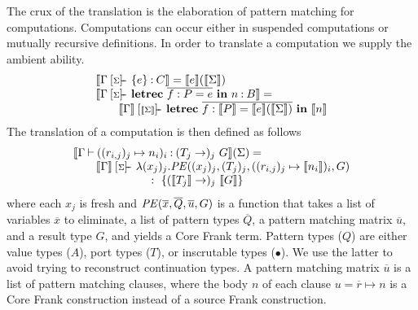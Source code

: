 \documentclass[11pt]{article}
\makeatletter
\newcommand{\many}{\overline}
\newcommand{\sem}[1]{\llbracket{#1}\rrbracket}
\newcommand\ba{\begin{array}}
\newcommand\ea{\end{array}}
\newcommand{\bl}{\ba[t]{@{}l@{}}}
\newcommand{\el}{\ea}
\newenvironment{syntax}{\[\ba{@{}l@{~}r@{~}c@{~}l@{}}}{\ea\]\ignorespacesafterend}
\newcommand{\sigentails}[1]{\mathbin{[{\text{\scriptsize ${#1}$}}]\!\text{-\!-}}\,}
\newcommand{\checkbase}[4]{#2 \mathbin{#1} #4 \mathbin{:} #3}
\newcommand{\has}[4]{\checkbase{\sigentails{#2}}{#1}{#3}{#4}}
\newcommand{\does}[3]{\checkbase{\vdash}{#1}{#2}{#3}}
\newcommand{\hasgs}{\has{\Gamma}{\sigs}}
\newcommand{\doesg}{\does{\Gamma}}
\newcommand{\checksgs}{\hasgs}
\newcommand{\checksdefg}{\doesg}
\newcommand{\sigs}{\Sigma}
\newcommand{\key}[1]{\textbf{#1}} %
\newcommand{\thunk}[1]{\{{#1}\}}
\newcommand\slab[1]{(\textrm{#1})}
\makeatother
\begin{document}
The crux of the translation is the elaboration of pattern matching for
computations. Computations can occur either in suspended computations
or mutually recursive definitions. In order to translate a computation
we supply the ambient ability.
%
\[
\bl
\sem{\checksgs{C}{\thunk{e}}} = \sem{e}(\sem{\sigs}) \\
\sem{\checksgs{B}{\key{letrec}~\many{f : P = e}~\key{in}~n}} = \\
\qquad
  \sem{\Gamma} \sigentails{\sem{\sigs}} \key{letrec}~\many{f : \sem{P} = \sem{e}(\sem{\sigs})}~\key{in}~\sem{n} \\
\el
\]
The translation of a computation is then defined as follows
\[
\bl
\sem{\checksdefg{(T_j \to)_j~ G}{{((r_{i,j})_j \mapsto n_i)_i}}}(\sigs) = \\
\qquad
 \sem{\Gamma} \sigentails{\sigs}
   \bl
   \lambda (x_j)_j.
     \PE((x_j)_j, (T_j)_j, ((r_{i,j})_j \mapsto \sem{n_i})_i, G) \\
   \quad~:~\thunk{(\sem{T_j} \to)_j~ \sem{G}}
   \el \\
\el
\]
where each $x_j$ is fresh and $\PE(\many{x}, \many{Q}, \many{u}, G)$
is a function that takes a list of variables $\many{x}$ to eliminate,
a list of pattern types $\many{Q}$, a pattern matching matrix
$\many{u}$, and a result type $G$, and yields a Core Frank term.
%
Pattern types ($Q$) are either value types ($A$), port types ($T$), or
inscrutable types ($\bullet$). We use the latter to avoid trying to
reconstruct continuation types.
%
%
A pattern matching matrix $\many{u}$ is a list of pattern matching
clauses, where the body $n$ of each clause $u = \many{r} \mapsto n$ is
a Core Frank construction instead of a source Frank construction.
\end{document}
